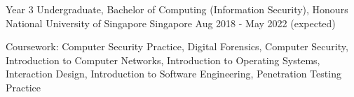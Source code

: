 

\begin{cventries}

  \cventry
  {Year 3 Undergraduate, Bachelor of Computing (Information Security), Honours} %
  {National University of Singapore} %
  {Singapore} %
  {Aug 2018 - May 2022 (expected)} %
  {
    \begin{cvitems} %
      \item {Coursework: Computer Security Practice, Digital Forensics, Computer Security, Introduction to Computer Networks, Introduction to Operating Systems, Interaction Design, Introduction to Software Engineering, Penetration Testing Practice}
    \end{cvitems}
  }

\end{cventries}
